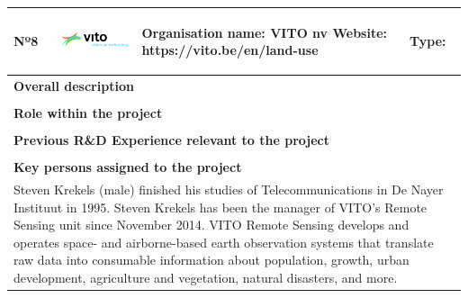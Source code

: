 \begin{longtable}[H]{|p{0.7cm}|p{4cm}|p{7cm}|p{1.3cm}|}
	\hline
	\begin{center} Nº8 \end{center} & \begin{center} \includegraphics[scale=0.35]{./logos/vito-logo} \end{center} & \begin{center} \textbf{Organisation name:} VITO nv \newline \textbf{Website:} https://vito.be/en/land-use \end{center} & \begin{center} Type: \end{center} \\ \hline
	
	\multicolumn{4}{|p{13cm}|}{\textbf{Overall description}}  \\ \hline
	
	\multicolumn{4}{|p{14.5cm}|}{}  \\ \hline
	
	\multicolumn{4}{|p{13cm}|}{\textbf{Role within the project}}   \\ \hline
	
	\multicolumn{4}{|p{14.5cm}|}{}  \\ \hline
	
	\multicolumn{4}{|p{13cm}|}{\textbf{Previous R\&D Experience relevant to the project}}  \\ \hline
	
	\multicolumn{4}{|p{14.5cm}|}{}  \\ \hline
	
	\multicolumn{4}{|p{13cm}|}{\textbf{Key persons assigned to the project}}   \\ \hline
	
	\multicolumn{4}{|p{14.5cm}|}{Steven Krekels (male) finished his studies of Telecommunications in De Nayer Instituut in 1995. Steven Krekels has been the manager of VITO’s Remote Sensing unit since November 2014. VITO Remote Sensing develops and operates space- and airborne-based earth observation systems that translate raw data into consumable information about population, growth, urban development, agriculture and vegetation, natural disasters, and more.}  \\ \hline
	

\end{longtable}
